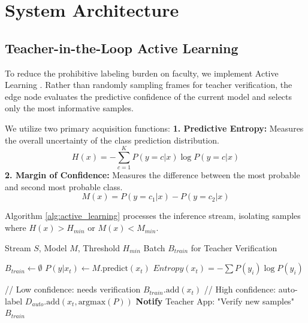 \documentclass[conference]{IEEEtran}
\begin{document}
\section{System Architecture}

\subsection{Teacher-in-the-Loop Active Learning}



To reduce the prohibitive labeling burden on faculty, we implement Active Learning \cite{b19}. Rather than randomly sampling frames for teacher verification, the edge node evaluates the predictive confidence of the current model and selects only the most informative samples.

We utilize two primary acquisition functions:
\textbf{1. Predictive Entropy:} Measures the overall uncertainty of the class prediction distribution.
\begin{equation}
H(x) = -\sum_{c=1}^{K} P(y=c|x) \log P(y=c|x)
\end{equation}
\textbf{2. Margin of Confidence:} Measures the difference between the most probable and second most probable class.
\begin{equation}
M(x) = P(y=c_1|x) - P(y=c_2|x)
\end{equation}

Algorithm \ref{alg:active_learning} processes the inference stream, isolating samples where $H(x) > H_{min}$ or $M(x) < M_{min}$.

\begin{algorithm}[h]
\caption{Active Learning Selection (Edge Node)}
\begin{algorithmic}[1]
\REQUIRE Stream $S$, Model $M$, Threshold $H_{min}$
\ENSURE Batch $B_{train}$ for Teacher Verification

\STATE $B_{train} \leftarrow \emptyset$
    \STATE $P(y|x_t) \leftarrow M.\text{predict}(x_t)$
    \STATE $Entropy(x_t) = -\sum P(y_i)\log P(y_i)$
      
        \STATE // Low confidence: needs verification
        \STATE $B_{train}.\text{add}(x_t)$
    \ELSE
        \STATE // High confidence: auto-label
        \STATE $D_{auto}.\text{add}(x_t, \text{argmax}(P))$
    \ENDIF
\ENDFOR
\STATE \textbf{Notify} Teacher App: "Verify new samples"
\RETURN $B_{train}$
\end{algorithmic}
\label{alg:active_learning}
\end{algorithm}
\end{document}
